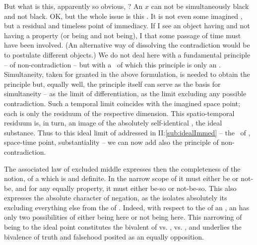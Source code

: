 \label{pa:immedNexus}
But what is this, apparently so obvious, ? An $x$ can not
be simultaneously black and not black. OK, but the whole issue is this
. It is not even some imagined , but a residual and timeless point of immediacy. If I see an object
having and not having a property 
(or being and not being), I  that some passage of time must have been
involved. (An alternative way of dissolving the contradiction would be to
postulate different objects.) We do not deal here with a
fundamental principle -- of non-contradiction -- but with a \nexus\ of which
this principle is only an . Simultaneity, taken for granted in the
above formulation, is needed to obtain the
principle but, equally well, the principle itself can serve as the basis for
 simultaneity -- as the limit of differentiation, as the limit
excluding any possible contradiction. Such a temporal limit
coincides with the imagined space point; each is only the  residuum of
the respective dimension. This spatio-temporal residuum
is, in turn, an image of the absolutely self-identical , the ideal
substance. Thus to this ideal limit of  addressed in
II:\ref{sub:idealImmed} -- the \nexus\ of 
, space-time point, substantiality -- we can now add also the
principle of non-contradiction. 

The associated law of excluded middle expresses then the completeness of
the notion, of a  which is  and definite. In the
narrow scope of  it must either be or not-be, and for any equally
 property, it must either be-so or not-be-so.  This also expresses
the absolute character of negation, as the  isolates
absolutely its  excluding everything else from the  of
.  Indeed, with respect to the  of an , an
 has only two possibilities of either being here or not being here.
This narrowing of being to the ideal point constitutes the bivalent
 of  vs. ,  vs. , and
underlies the bivalence of 
truth and falsehood posited as an equally  opposition.


